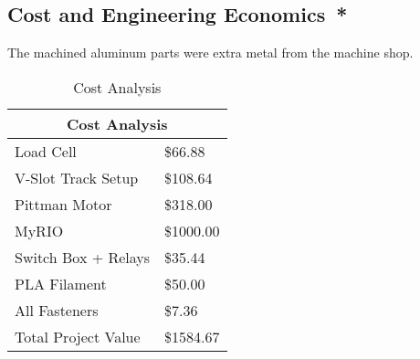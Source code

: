 \subsection*{Cost and Engineering Economics{{\color{red}\ *}}}
The machined aluminum parts were extra metal from the machine shop.

\begin{table}[H]
	\caption{Cost Analysis}
	\centering
	\label{cost_analysis}
	\begin{tabular}{|l|l|}
		\hline
		\multicolumn{2}{|c|}{Cost Analysis} \\ \hline	\hline
		Load Cell             & \$66.88     \\ \hline
		V-Slot Track Setup    & \$108.64    \\ \hline
		Pittman Motor         & \$318.00    \\ \hline
		MyRIO                 & \$1000.00   \\ \hline
		Switch Box + Relays   & \$35.44     \\ \hline
		PLA Filament          & \$50.00     \\ \hline
		All Fasteners         & \$7.36      \\ \hline	\hline
		Total Project Value   & \$1584.67   \\ \hline
	\end{tabular}
\end{table}